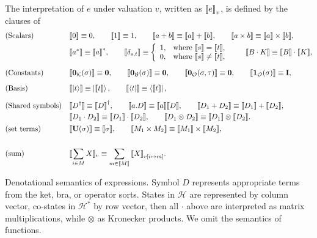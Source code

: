 \begin{definition}
The interpretation of $e$ under valuation $v$, written as ${\llbracket e \rrbracket}_v$, is defined by the clauses of 
 \begin{align*}
    & \text{(Scalars)} && 
 {\llbracket 0 \rrbracket} \equiv 0, 
 \qquad 
 {\llbracket 1 \rrbracket} \equiv 1,
 \qquad
 {\llbracket a + b \rrbracket} \equiv {\llbracket a \rrbracket} + {\llbracket b \rrbracket},
 \qquad
 {\llbracket a \times b \rrbracket} \equiv {\llbracket a \rrbracket} \times {\llbracket b \rrbracket}, 
    \\ & &&
 {\llbracket a^* \rrbracket} \equiv {\llbracket a \rrbracket}^*,
 \qquad
 {\llbracket \delta_{s, t} \rrbracket} \equiv \left\{
 \begin{array}{ll}
        1, & \text{where } {\llbracket s \rrbracket} = {\llbracket t \rrbracket}, \\
        0, & \text{where } {\llbracket s \rrbracket} \neq {\llbracket t \rrbracket}, 
 \end{array}
 \right.
 \qquad
 {\llbracket B \cdot K \rrbracket} \equiv {\llbracket B \rrbracket} \cdot {\llbracket K \rrbracket},
  \\[0.2cm]
    & \text{(Constants)} &&
 {\llbracket \mathbf{0}_\mathcal{K}(\sigma) \rrbracket} \equiv \mathbf{0}, 
 \qquad
 {\llbracket \mathbf{0}_\mathcal{B}(\sigma) \rrbracket} \equiv \mathbf{0},
 \qquad
 {\llbracket \mathbf{0}_\mathcal{O}(\sigma, \tau) \rrbracket} \equiv \mathbf{0}, 
 \qquad
 {\llbracket \mathbf{1}_\mathcal{O}(\sigma) \rrbracket} \equiv \mathbf{I},
  \\[0.2cm]
    & \text{(Basis)} &&
 {\llbracket \ket{t} \rrbracket} \equiv \ket{{\llbracket t \rrbracket}},
 \qquad
 {\llbracket \bra{t} \rrbracket} \equiv \bra{{\llbracket t \rrbracket}},
  \\[0.2cm]
    & \text{(Shared symbols)} &&
 {\llbracket D^\dagger \rrbracket} \equiv {\llbracket D \rrbracket}^\dagger,
 \qquad
 {\llbracket a.D \rrbracket} \equiv {\llbracket a \rrbracket} {\llbracket D \rrbracket},
 \qquad
 {\llbracket D_1 + D_2 \rrbracket} \equiv {\llbracket D_1 \rrbracket}+{\llbracket D_2 \rrbracket}, \\
    & &&
 {\llbracket D_1 \cdot D_2 \rrbracket} \equiv {\llbracket D_1 \rrbracket} \cdot {\llbracket D_2 \rrbracket},
 \qquad
 {\llbracket D_1 \otimes D_2 \rrbracket} \equiv {\llbracket D_1 \rrbracket} \otimes {\llbracket D_2 \rrbracket}. \\
       & \text{(set terms)} && \begin{aligned}
    {\llbracket \mathbf{U}(\sigma) \rrbracket} \equiv {\llbracket \sigma \rrbracket},
    \qquad
    {\llbracket M_1 \times M_2 \rrbracket} \equiv {\llbracket M_1 \rrbracket} \times {\llbracket M_2 \rrbracket},
    \end{aligned} \\
       \\
       & \text{(sum)} &&
    \llbracket \sum_{i \in M} X \rrbracket_v \equiv \sum_{m \in {\llbracket M \rrbracket}} {\llbracket X \rrbracket}_{v[i\mapsto m]}.   
\end{align*}
\end{definition}
Denotational semantics of expressions. Symbol $D$ represents appropriate terms from the ket, bra, or operator sorts. States in $\mathcal{H}$ are represented by column vector, co-states in $\mathcal{H}^*$ by row vector, then all $\cdot$ above are interpreted as matrix multiplications, while $\otimes$ as Kronecker products.
We omit the semantics of functions.



